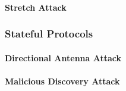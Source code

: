 \paragraph{\textbf{Stretch Attack}}

\subsubsection{Stateful Protocols}

\paragraph{\textbf{Directional Antenna Attack}}

\paragraph{\textbf{Malicious Discovery Attack}}
